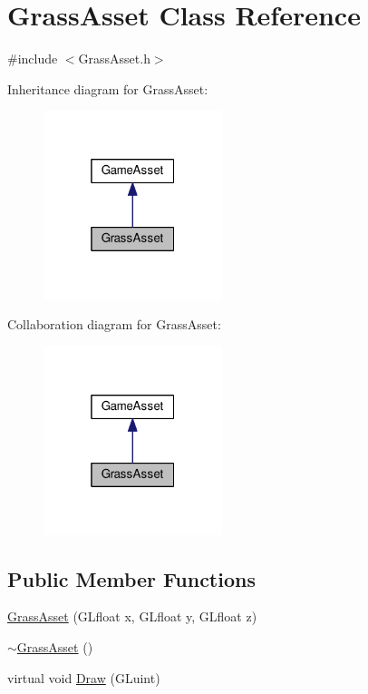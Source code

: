 \hypertarget{classGrassAsset}{}\section{Grass\+Asset Class Reference}
\label{classGrassAsset}


{\ttfamily \#include $<$Grass\+Asset.\+h$>$}



Inheritance diagram for Grass\+Asset\+:\nopagebreak
\begin{figure}[H]
\begin{center}
\leavevmode
\includegraphics[width=148pt]{classGrassAsset__inherit__graph}
\end{center}
\end{figure}


Collaboration diagram for Grass\+Asset\+:\nopagebreak
\begin{figure}[H]
\begin{center}
\leavevmode
\includegraphics[width=148pt]{classGrassAsset__coll__graph}
\end{center}
\end{figure}
\subsection*{Public Member Functions}
\begin{DoxyCompactItemize}
\item 
\hyperlink{classGrassAsset_a961ec7133a9fc6f16a7347a122f95952}{Grass\+Asset} (G\+Lfloat x, G\+Lfloat y, G\+Lfloat z)
\item 
\hyperlink{classGrassAsset_a07e2206bacd2ec120f27f20e5df635b7}{$\sim$\+Grass\+Asset} ()
\item 
virtual void \hyperlink{classGrassAsset_a0178a72c5bf2f00bcc6a240b851f3a25}{Draw} (G\+Luint)
\end{DoxyCompactItemize}
